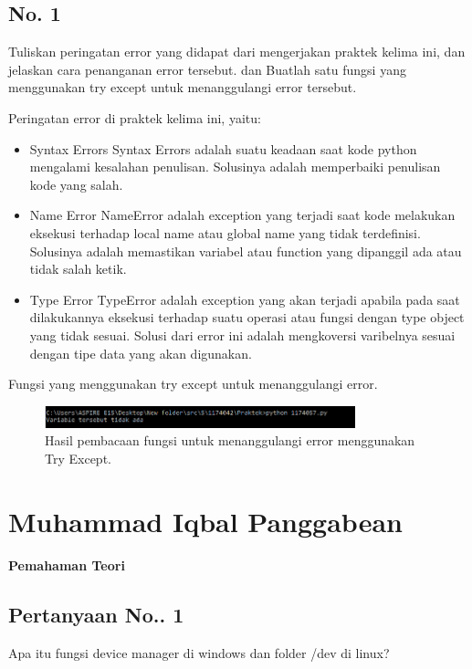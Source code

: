 	\subsection{No. 1}
	Tuliskan  peringatan  error  yang  didapat  dari  mengerjakan  praktek  kelima  ini, dan  jelaskan  cara  penanganan  error  tersebut.   dan  Buatlah  satu  fungsi  yang menggunakan try except untuk menanggulangi error tersebut.
	
	\hfill \break
	Peringatan error di praktek kelima ini, yaitu:
	
	\begin{itemize}
		\item Syntax Errors
		Syntax Errors adalah suatu keadaan saat kode python mengalami kesalahan penulisan. Solusinya adalah memperbaiki penulisan kode yang salah.
		
		\item Name Error
		NameError adalah exception yang terjadi saat kode melakukan eksekusi terhadap local name atau global name yang tidak terdefinisi. Solusinya adalah memastikan variabel atau function yang dipanggil ada atau tidak salah ketik.
		
		\item Type Error
		TypeError adalah exception yang akan terjadi apabila pada saat dilakukannya eksekusi terhadap suatu operasi atau fungsi dengan type object yang tidak sesuai. Solusi dari error ini adalah mengkoversi varibelnya sesuai dengan tipe data yang akan digunakan.
	\end{itemize}

	\hfill \break
	Fungsi yang menggunakan try except untuk menanggulangi error.

	

	\begin{figure}[H]
		\includegraphics[width=9cm]{figures/chapter5/1174057/praktek/5.png}
		\centering
		\caption{Hasil pembacaan fungsi untuk menanggulangi error menggunakan Try Except.}
	\end{figure}	
	
\section{Muhammad Iqbal Panggabean}
{\Large \textbf{Pemahaman Teori}}
\subsection{Pertanyaan No.. 1}
Apa itu fungsi device manager di windows dan folder /dev di linux?

